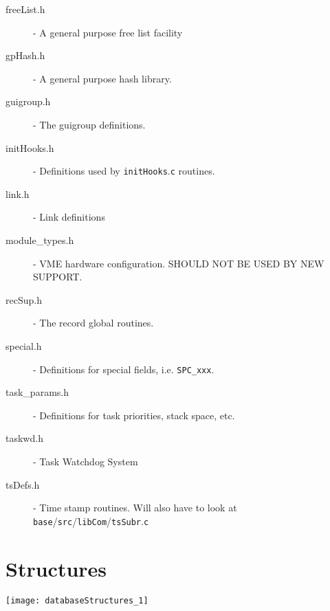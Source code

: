 \begin{description}
\item[freeList.h] - A general purpose free list facility

\item[gpHash.h] - A general purpose hash library.

\item[guigroup.h] - The guigroup definitions.

\item[initHooks.h] - Definitions used by \verb|initHooks|.\verb|c| routines.

\item[link.h] - Link definitions

\item[module\_types.h] - VME hardware configuration. SHOULD NOT BE USED BY NEW SUPPORT.

\item[recSup.h] - The record global routines.

\item[special.h] - Definitions for special fields, i.e. \verb|SPC_xxx|.

\item[task\_params.h] - Definitions for task priorities, stack space, etc.

\item[taskwd.h] - Task Watchdog System

\item[tsDefs.h] - Time stamp routines. Will also have to look at \verb|base|/\verb|src|/\verb|libCom|/\verb|tsSubr|.\verb|c|

\end{description}

\newpage

\section{Structures}

\begin{center}

\texttt{[image: databaseStructures\_1]}

\end{center}
